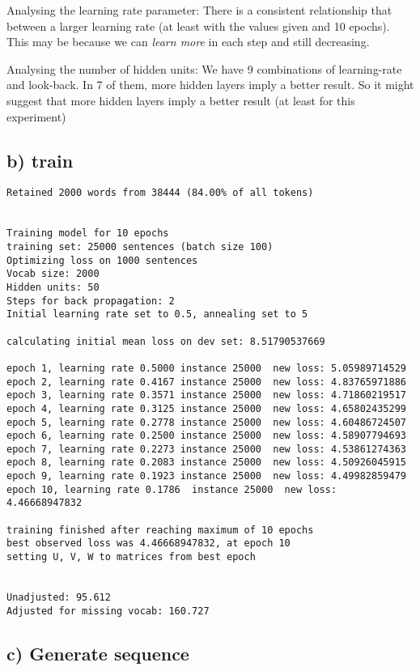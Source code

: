 \documentclass{article}
\begin{document}
Analysing the learning rate parameter: There is a consistent relationship that between a larger learning rate (at least with the values given and 10 epochs). This may be because we can \textit{learn more} in each step and still decreasing. 

Analysing the number of hidden units: We have 9 combinations of learning-rate and look-back. In 7 of them, more hidden layers imply a better result. So it might suggest that more hidden layers imply a better result (at least for this experiment)

\newpage
\subsection*{b) train}
\begin{lstlisting}
Retained 2000 words from 38444 (84.00% of all tokens)     
      
      
Training model for 10 epochs      
training set: 25000 sentences (batch size 100)      
Optimizing loss on 1000 sentences     
Vocab size: 2000      
Hidden units: 50      
Steps for back propagation: 2     
Initial learning rate set to 0.5, annealing set to 5      
      
calculating initial mean loss on dev set: 8.51790537669     
      
epoch 1, learning rate 0.5000 instance 25000  new loss: 5.05989714529
epoch 2, learning rate 0.4167 instance 25000  new loss: 4.83765971886
epoch 3, learning rate 0.3571 instance 25000  new loss: 4.71860219517
epoch 4, learning rate 0.3125 instance 25000  new loss: 4.65802435299
epoch 5, learning rate 0.2778 instance 25000  new loss: 4.60486724507
epoch 6, learning rate 0.2500 instance 25000  new loss: 4.58907794693
epoch 7, learning rate 0.2273 instance 25000  new loss: 4.53861274363
epoch 8, learning rate 0.2083 instance 25000  new loss: 4.50926045915
epoch 9, learning rate 0.1923 instance 25000  new loss: 4.49982859479
epoch 10, learning rate 0.1786  instance 25000  new loss: 4.46668947832
      
training finished after reaching maximum of 10 epochs     
best observed loss was 4.46668947832, at epoch 10     
setting U, V, W to matrices from best epoch     
      
      
Unadjusted: 95.612      
Adjusted for missing vocab: 160.727     
\end{lstlisting}

\subsection*{c) Generate sequence}
\end{document}
